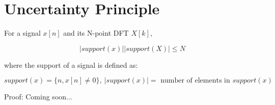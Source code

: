 \documentclass[11pt]{article}
\begin{document}
\section{Uncertainty Principle}

For a signal $x[n]$ and its N-point DFT $X[k]$, 

\[ |support(x)||support(X)| \leq N \]

where the support of a signal is defined as:

\[ support(x)=\{n, x[n] \neq 0\},\ |support(x)| = \text{ number of elements in } support(x) \]

{\color{blue}
Proof: Coming soon...
}

%
\end{document}
